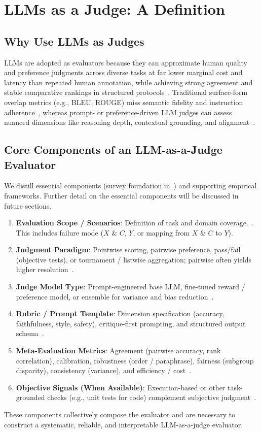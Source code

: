 \section{LLMs as a Judge: A Definition}

\subsection{Why Use LLMs as Judges}
LLMs are adopted as evaluators because they can approximate human quality and preference judgments across diverse tasks at far lower marginal cost and latency than repeated human annotation, while achieving strong agreement and stable comparative rankings in structured protocols~\cite{li2024_llmsasjudges, zheng2023judgelm, bavaresco2024judgebench}. Traditional surface-form overlap metrics (e.g., BLEU, ROUGE) miss semantic fidelity and instruction adherence~\cite{papineni2002bleu, lin2004rouge}, whereas prompt- or preference-driven LLM judges can assess nuanced dimensions like reasoning depth, contextual grounding, and alignment~\cite{fu2023gptscore, stiennon2020learning, ouyang2022training}.

\subsection{Core Components of an LLM-as-a-Judge Evaluator}
We distill essential components (survey foundation in~\cite{li2024_llmsasjudges}) and supporting empirical frameworks. Further detail on the essential components will be discussed in future sections.
\begin{enumerate}
	\item \textbf{Evaluation Scope / Scenarios}: Definition of task and domain coverage.~\cite{liang2022helm, srivastava2022bigbench}. This includes failure mode ($X$ \& $C$, $Y$, or mapping from $X$ \& $C$ to $Y$).
	\item \textbf{Judgment Paradigm}: Pointwise scoring, pairwise preference, pass/fail (objective tests), or tournament / listwise aggregation; pairwise often yields higher resolution~\cite{bradley1952rank, zheng2023judgelm, liu2024pairs, chen2021evaluating}.
	\item \textbf{Judge Model Type}: Prompt-engineered base LLM, fine-tuned reward / preference model, or ensemble for variance and bias reduction~\cite{stiennon2020learning, ouyang2022training, bavaresco2024judgebench}.
	\item \textbf{Rubric / Prompt Template}: Dimension specification (accuracy, faithfulness, style, safety), critique-first prompting, and structured output schema~\cite{fu2023gptscore, li2024_llmsasjudges}.
	\item \textbf{Meta-Evaluation Metrics}: Agreement (pairwise accuracy, rank correlation), calibration, robustness (order / paraphrase), fairness (subgroup disparity), consistency (variance), and efficiency / cost~\cite{bavaresco2024judgebench, hada2024metal, li2024_llmsasjudges}.
	\item \textbf{Objective Signals (When Available)}: Execution-based or other task-grounded checks (e.g., unit tests for code) complement subjective judgment~\cite{chen2021evaluating, li2024_llmsasjudges}.
\end{enumerate} 

These components collectively compose the evaluator and are necessary to construct a systematic, reliable, and interpretable LLM-as-a-judge evaluator.